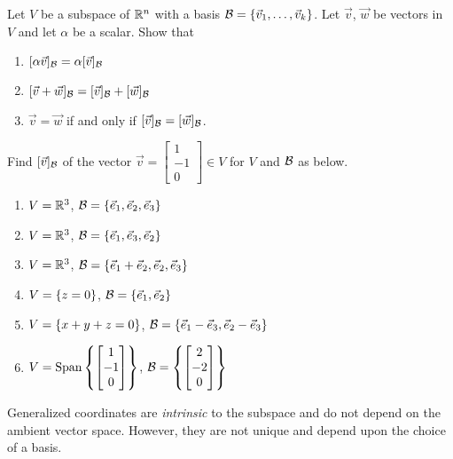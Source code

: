 \begin{qbox}
    Let $V$ be a subspace of $\mathbb{R}^n$ with a basis $\mathcal{B} = \left\{\vec{v}_1, \dots, \vec{v}_k\right\}$.
    Let $\vec{v}$, $\vec{w}$ be vectors in $V$ and let $\alpha$ be a scalar.
    Show that
    \begin{enumerate}
      \item $[\alpha \vec{v}]_{\mathcal{B}} = \alpha [\vec{v}]_{\mathcal{B}}$
      \item $[\vec{v} + \vec{w}]_{\mathcal{B}} = [\vec{v}]_{\mathcal{B}} + [\vec{w}]_{\mathcal{B}}$
      \item $\vec{v} = \vec{w}$ if and only if $[\vec{v}]_{\mathcal{B}} = [\vec{w}]_{\mathcal{B}}$.
    \end{enumerate}
\end{qbox}

\begin{qbox}
  Find $[\vec{v}]_{\mathcal{B}}$ of the vector $\vec{v} = \begin{bmatrix} 1 \\ -1 \\ 0 \end{bmatrix} \in V$ for $V$ and $\mathcal{B}$ as below.
    \begin{enumerate}
      \item $V = \mathbb{R}^3$, $\mathcal{B} = \left\{\vec{e}_1, \vec{e}_2, \vec{e}_3\right\}$
      \item $V = \mathbb{R}^3$, $\mathcal{B} = \left\{\vec{e}_1, \vec{e}_3, \vec{e}_2\right\}$
      \item $V = \mathbb{R}^3$, $\mathcal{B} = \left\{\vec{e}_1 + \vec{e}_2, \vec{e}_2, \vec{e}_3\right\}$
      \item $V = \left\{z = 0\right\}$, $\mathcal{B} = \left\{\vec{e}_1, \vec{e}_2\right\}$
      \item $V = \left\{x + y + z = 0\right\}$, $\mathcal{B} = \left\{\vec{e}_1 - \vec{e}_3, \vec{e}_2 - \vec{e}_3\right\}$
      \item $V = \operatorname{Span}\left\{\begin{bmatrix} 1 \\ -1 \\ 0 \end{bmatrix}\right\}$, $\mathcal{B} = \left\{\begin{bmatrix} 2 \\ -2 \\ 0 \end{bmatrix}\right\}$
      \end{enumerate}
\end{qbox}


	Generalized coordinates are \emph{intrinsic} to the subspace and do not depend on the ambient vector space.
  However, they are not unique and depend upon the choice of a basis.

